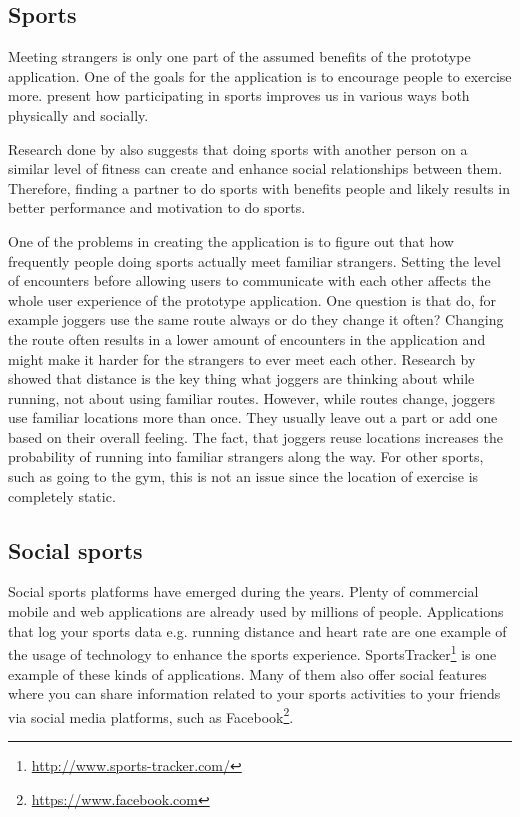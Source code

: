 \subsection{Sports}

Meeting strangers is only one part of the assumed benefits of the prototype application. One of the goals for the application is to encourage people to exercise more. \cite{foundations} present how participating in sports improves us in various ways both physically and socially.

Research done by \cite{joggingTheDistance} also suggests that doing sports with another person on a similar level of fitness can create and enhance social relationships between them. Therefore, finding a partner to do sports with benefits people and likely results in better performance and motivation to do sports.

One of the problems in creating the application is to figure out that how frequently people doing sports actually meet familiar strangers. Setting the level of encounters before allowing users to communicate with each other affects the whole user experience of the prototype application. One question is that do, for example joggers use the same route always or do they change it often? Changing the route often results in a lower amount of encounters in the application and might make it harder for the strangers to ever meet each other. Research by \cite{runningNavigation} showed that distance is the key thing what joggers are thinking about while running, not about using familiar routes. However, while routes change, joggers use familiar locations more than once. They usually leave out a part or add one based on their overall feeling. The fact, that joggers reuse locations increases the probability of running into familiar strangers along the way. For other sports, such as going to the gym, this is not an issue since the location of exercise is completely static.

\subsection{Social sports}

Social sports platforms have emerged during the years. Plenty of commercial mobile and web applications  are already used by millions of people. Applications that log your sports data e.g. running distance and heart rate are one example of the usage of technology to enhance the sports experience. SportsTracker\footnote{\url{http://www.sports-tracker.com/}} is one example of these kinds of applications. Many of them also offer social features where you can share information related to your sports activities to your friends via social media platforms, such as Facebook\footnote{\url{https://www.facebook.com}}.

